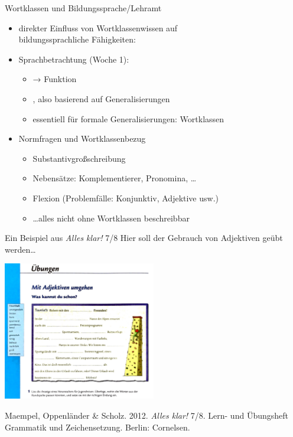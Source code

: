 \begin{frame}
  {Wortklassen und Bildungssprache\slash Lehramt}
  \pause
  \begin{itemize}[<+->]
    \item direkter Einfluss von Wortklassenwissen auf\\
      bildungssprachliche Fähigkeiten: 
      \Zeile
    \item Sprachbetrachtung (Woche 1):
      \begin{itemize}[<+->]
        \item {} → \alert{Funktion}
        \item {}, also basierend auf \alert{Generalisierungen}
        \item essentiell für formale Generalisierungen: \alert{Wortklassen}
      \end{itemize}
      \Zeile
    \item Normfragen und Wortklassenbezug
      \begin{itemize}
        \item \alert{Substantivgroßschreibung}
        \item Nebensätze: Komplementierer, Pronomina, \ldots
        \item Flexion (Problemfälle: Konjunktiv, Adjektive usw.)
        \item \dots alles nicht ohne Wortklassen beschreibbar
      \end{itemize}
  \end{itemize}
\end{frame}


\begin{frame}
  {Ein Beispiel aus \textit{Alles klar!} 7\slash 8}
  \pause
  Hier soll der Gebrauch von \alert{Adjektiven} geübt werden\ldots
  \pause
  \begin{center}
    \includegraphics[width=0.5\textwidth]{graphics/adjektive1}
  \end{center}
  \tiny Maempel, Oppenländer \& Scholz. 2012. \textit{Alles klar!} 7\slash 8. Lern- und Übungsheft Grammatik und Zeichensetzung. Berlin: Cornelsen.
\end{frame}


